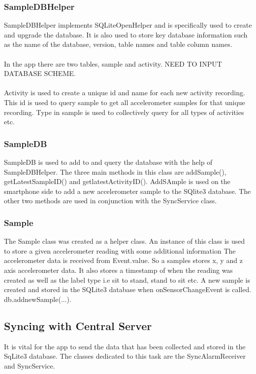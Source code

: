 \subsubsection{SampleDBHelper} %
\label{ssub:db_helper}
SampleDBHelper implements SQLiteOpenHelper and is specifically used to create and upgrade the database. It is also used to store key database information such as the name of the database, version, table names and table column names. 
\paragraph{}
In the app there are two tables, sample and activity. NEED TO INPUT DATABASE SCHEME.
\paragraph{}
Activity is used to create a unique id and name for each new activity recording. This id is used to query sample to get all accelerometer samples for that unique recording. Type in sample is used to collectively query for all types of activities etc.
\subsubsection{SampleDB} %
\label{ssub:db}
SampleDB is used to add to and query the database with the help of SampleDBHelper. The three main methods in this class are addSample(), getLatestSampleID() and getlatestActivityID(). AddSAmple is used on the smartphone side to add a new accelerometer sample to the SQlite3 database. The other two methods are used in conjunction with the SyncService class.
\subsubsection{Sample} %
\label{ssub:sample}
The Sample class was created as a helper class. An instance of this class is used to store a given accelerometer reading with some additional information The accelerometer data is received from Event.value. So a samples stores x, y and z axis accelerometer data. It also stores a timestamp of when the reading was created as well as the label type i.e sit to stand, stand to sit etc. A new sample is created and stored in the SQLite3 database when onSensorChangeEvent is called. db.addnewSample(...).

\subsection{Syncing with Central Server} %
\label{sub:synching}
It is vital for the app to send the data that has been collected and stored in the SqLite3 database. The classes dedicated to this task are the SyncAlarmReceiver and SyncService.
